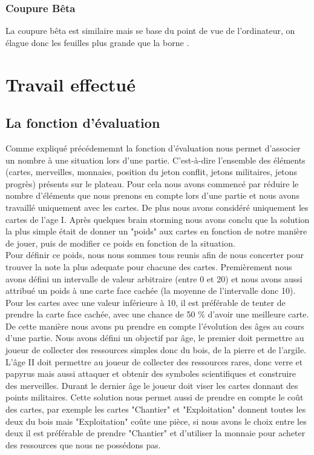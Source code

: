 \documentclass[12pt]{article}
\begin{document}
	\subsubsection{Coupure Bêta}
	    \label{coupure_beta}
    	La coupure bêta est similaire mais se base du point de vue de l'ordinateur, on élague donc les
    	feuilles plus grande que la borne \cite{wiki_7_wonder}.

	\section{Travail effectué}
	\subsection{La fonction d'évaluation}
    	Comme expliqué précédememnt la fonction d'évaluation nous permet d'associer un nombre à une situation lors d'une partie. C'est-à-dire l'ensemble des éléments (cartes, merveilles, monnaies, position du jeton conflit, jetons militaires, jetons progrès) présents sur le plateau. Pour cela nous avons commencé par réduire le nombre d'éléments que nous prenons en compte lors d'une partie et nous avons travaillé uniquement avec les cartes. De plus nous avons considéré uniquement les cartes de l'age I. Après quelques brain storming nous avons conclu que la solution la plus simple était de donner un "poids" aux cartes en fonction de notre manière de jouer, puis de modifier ce poids en fonction de la situation. \\
    
    	Pour définir ce poids, nous nous sommes tous reunis afin de nous concerter pour trouver la note la plus adequate pour chacune des cartes. Premièrement nous avons défini un intervalle de valeur arbitraire (entre 0 et 20) et nous avons aussi attribué un poids à une carte face cachée (la moyenne de l'intervalle donc 10). Pour les cartes avec une valeur	inférieure à 10, il est préférable de tenter de prendre la carte face cachée, avec une chance de 50 \% d'avoir une meilleure carte. De cette manière nous avons pu prendre en compte l'évolution des âges au cours d'une partie. Nous avons défini un objectif par âge, le premier doit permettre au joueur de collecter des ressources simples donc du bois, de la pierre et de l'argile. L'âge II doit permettre au joueur de collecter des ressources rares, donc verre et papyrus mais aussi attaquer et obtenir des symboles scientifiques et construire des merveilles. Durant le dernier âge le joueur doit viser les cartes donnant des points militaires. Cette solution nous permet aussi de prendre en compte le coût des cartes, par exemple les cartes "Chantier" et "Exploitation" donnent toutes les deux du bois mais "Exploitation" coûte une pièce, si nous avons le choix entre les deux il est préférable de prendre "Chantier" et d'utiliser la monnaie pour acheter des ressources que nous ne possédons pas. \\
    	
\end{document}
